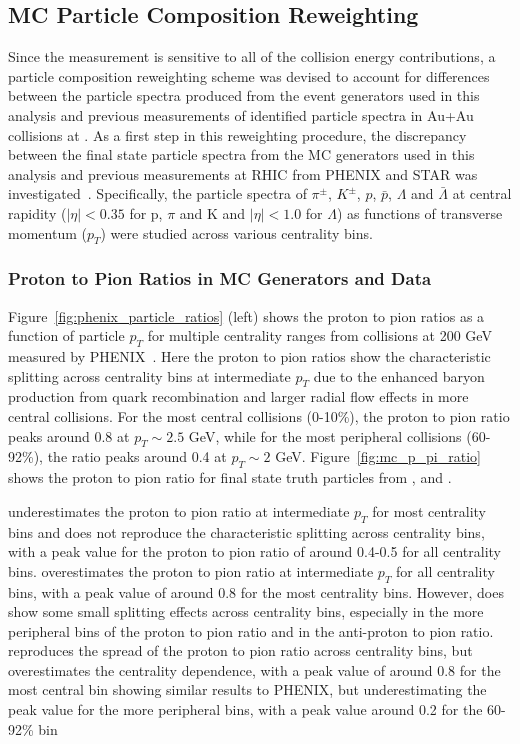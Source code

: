 \subsection{MC Particle Composition Reweighting}
Since the \detdeta measurement is sensitive to all of the collision energy contributions, a particle composition reweighting scheme was devised to account for differences between the particle spectra produced from the event generators used in this analysis and previous measurements of identified particle spectra in Au+Au collisions at \sqsntwo.
As a first step in this reweighting procedure, the discrepancy between the final state particle spectra from the MC generators used in this analysis and previous measurements at RHIC from PHENIX and STAR was investigated~\cite{phenix_particle_spectra,star_lambda_spectra}. 
Specifically, the particle spectra of $\pi^{\pm}$, $K^{\pm}$, $p$, $\bar{p}$, $\Lambda$ and $\bar{\Lambda}$ at central rapidity ($|\eta| < 0.35$ for p, $\pi$ and K and $|\eta| < 1.0$ for $\Lambda$) as functions of transverse momentum ($p_{T}$) were studied across various centrality bins.

\subsubsection{Proton to Pion Ratios in MC Generators and Data}

Figure~\ref{fig:phenix_particle_ratios} (left) shows the proton to pion ratios as a function of particle $p_{T}$ for multiple centrality ranges from \auau collisions at 200 GeV measured by PHENIX~\cite{phenix_particle_spectra}.
Here the proton to pion ratios show the characteristic splitting across centrality bins at intermediate $p_{T}$ due to the enhanced baryon production from quark recombination and larger radial flow effects in more central collisions.
For the most central collisions (0-10\%), the proton to pion ratio peaks around 0.8 at $p_{T} \sim 2.5$ GeV, while for the most peripheral collisions (60-92\%), the ratio peaks around 0.4 at $p_{T} \sim 2$ GeV.
Figure~\ref{fig:mc_p_pi_ratio} shows the proton to pion ratio for final state truth particles from \hijing, \epos and \ampt. 

\hijing underestimates the proton to pion ratio at intermediate $p_{T}$ for most centrality bins and does not reproduce the characteristic splitting across centrality bins, with a peak value for the proton to pion ratio of around 0.4-0.5 for all centrality bins. 
\epos overestimates the proton to pion ratio at intermediate $p_{T}$ for all centrality bins, with a peak value of around 0.8 for the most centrality bins. 
However, \epos does show some small splitting effects across centrality bins, especially in the more peripheral bins of the proton to pion ratio and in the anti-proton to pion ratio.
\ampt reproduces the spread of the proton to pion ratio across centrality bins, but overestimates the centrality dependence, with a peak value of around 0.8 for the most central bin showing similar results to PHENIX, but underestimating the peak value for the more peripheral bins, with a peak value around 0.2 for the 60-92\% bin

